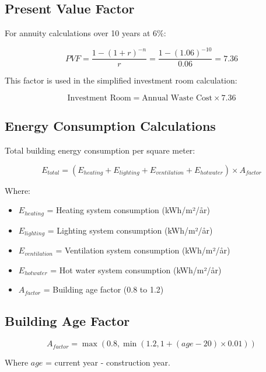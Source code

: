 \documentclass[12pt,a4paper]{article}
\begin{document}
\subsection{Present Value Factor}

For annuity calculations over 10 years at 6\%:

\begin{equation}
PVF = \frac{1 - (1 + r)^{-n}}{r} = \frac{1 - (1.06)^{-10}}{0.06} = 7.36
\end{equation}

This factor is used in the simplified investment room calculation:

\begin{equation}
\text{Investment Room} = \text{Annual Waste Cost} \times 7.36
\end{equation}

\subsection{Energy Consumption Calculations}

Total building energy consumption per square meter:

\begin{equation}
E_{total} = (E_{heating} + E_{lighting} + E_{ventilation} + E_{hotwater}) \times A_{factor}
\end{equation}

Where:
\begin{itemize}
\item $E_{heating}$ = Heating system consumption (kWh/m²/år)
\item $E_{lighting}$ = Lighting system consumption (kWh/m²/år)
\item $E_{ventilation}$ = Ventilation system consumption (kWh/m²/år)
\item $E_{hotwater}$ = Hot water system consumption (kWh/m²/år)
\item $A_{factor}$ = Building age factor (0.8 to 1.2)
\end{itemize}

\subsection{Building Age Factor}

\begin{equation}
A_{factor} = \max(0.8, \min(1.2, 1 + (age - 20) \times 0.01))
\end{equation}

Where $age$ = current year - construction year.
\end{document}
